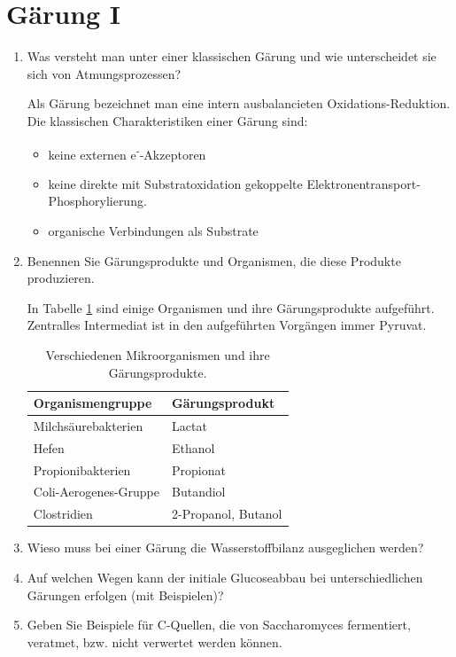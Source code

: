 
\section{Gärung I}
\begin{enumerate}
	\item Was versteht man unter einer klassischen Gärung und wie unterscheidet sie sich von Atmungsprozessen?
	
		Als Gärung bezeichnet man eine intern ausbalancieten Oxidations-Reduktion.
		Die klassischen Charakteristiken einer Gärung sind:
		\begin{itemize}
			\item keine externen e\textsuperscript{-}-Akzeptoren
			\item keine direkte mit Substratoxidation gekoppelte Elektronentransport-Phosphorylierung.
			\item organische Verbindungen als Substrate
		\end{itemize}

	\item Benennen Sie Gärungsprodukte und Organismen, die diese Produkte produzieren.
		
		In Tabelle \ref{tab:gaerungsprodukte} sind einige Organismen und ihre Gärungsprodukte aufgeführt.
		Zentralles Intermediat ist in den aufgeführten Vorgängen immer Pyruvat.
		\begin{table}[h!]
		\begin{center}
		\begin{tabular}{l l} 
		\toprule
			Organismengruppe			&	Gärungsprodukt\\
			\midrule
			Milchsäurebakterien		&	Lactat\\
			Hefen							&	Ethanol\\
			Propionibakterien			&	Propionat\\
			Coli-Aerogenes-Gruppe	&	Butandiol\\
			Clostridien					&	2-Propanol, Butanol\\
		\bottomrule
		\end{tabular}
		\caption{Verschiedenen Mikroorganismen und ihre Gärungsprodukte.}
		\label{tab:gaerungsprodukte}
		\end{center}
		\end{table}

	\item Wieso muss bei einer Gärung die Wasserstoffbilanz ausgeglichen werden?
	\item Auf welchen Wegen kann der initiale Glucoseabbau bei unterschiedlichen Gärungen erfolgen (mit Beispielen)?
	\item Geben Sie Beispiele für C-Quellen, die von Saccharomyces fermentiert, veratmet, bzw. nicht verwertet werden können.


\end{enumerate}

